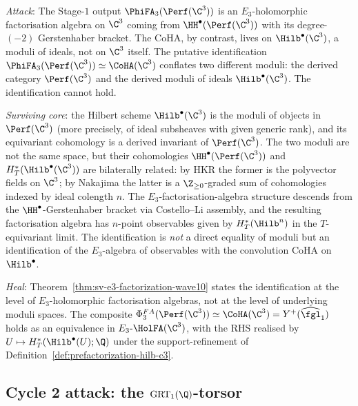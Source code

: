\begin{remark}
\label{rem:cycle-1-attack-heal-wave10}
\emph{Attack}: The Stage-$1$ output $\PhiFA_3(\Perf(\C^3))$ is an
$E_3$-holomorphic factorisation algebra on $\C^3$ coming from
$\HH^\bullet(\Perf(\C^3))$ with its degree-$(-2)$ Gerstenhaber bracket.
The CoHA, by contrast, lives on $\Hilb^\bullet(\C^3)$, a moduli of
ideals, not on $\C^3$ itself. The putative identification
$\PhiFA_3(\Perf(\C^3)) \simeq \CoHA(\C^3)$ conflates two different
moduli: the derived category $\Perf(\C^3)$ and the derived moduli of
ideals $\Hilb^\bullet(\C^3)$. The identification cannot hold.

\emph{Surviving core}: the Hilbert scheme $\Hilb^\bullet(\C^3)$ is the
moduli of objects in $\Perf(\C^3)$ (more precisely, of ideal
subsheaves with given generic rank), and its equivariant cohomology
is a derived invariant of $\Perf(\C^3)$. The two moduli are not the
same space, but their cohomologies $\HH^\bullet(\Perf(\C^3))$ and
$H^*_T(\Hilb^\bullet(\C^3))$ are bilaterally related: by HKR the former
is the polyvector fields on $\C^3$; by Nakajima the latter is a
$\Z_{\geq 0}$-graded sum of cohomologies indexed by ideal colength $n$.
The $E_3$-factorisation-algebra structure descends from the
$\HH^\bullet$-Gerstenhaber bracket via Costello--Li assembly, and the
resulting factorisation algebra has $n$-point observables given by
$H^*_T(\Hilb^n)$ in the $T$-equivariant limit. The identification is
\emph{not} a direct equality of moduli but an identification of the
$E_3$-algebra of observables with the convolution CoHA on
$\Hilb^\bullet$.

\emph{Heal}: Theorem~\ref{thm:sv-e3-factorization-wave10} states the
identification at the level of $E_3$-holomorphic factorisation algebras,
not at the level of underlying moduli spaces. The composite
$\Phi^{FA}_3(\Perf(\C^3)) \simeq \CoHA(\C^3) = Y^+(\widehat{\fgl}_1)$
holds as an equivalence in $E_3\text{-}\HolFA(\C^3)$, with the RHS
realised by $U \mapsto H^*_T(\Hilb^\bullet(U); \Q)$ under the
support-refinement of Definition~\ref{def:prefactorization-hilb-c3}.
\end{remark}

\subsection*{Cycle 2 attack: the $\mathrm{GRT}_1(\Q)$-torsor}

